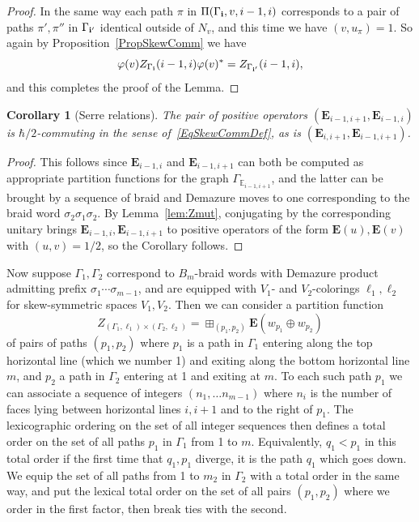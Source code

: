 \documentclass[11pt, reqno]{amsart}
\newtheorem{cor}[theorem]{Corollary}
\theoremstyle{definition}
\numberwithin{equation}{section}
\newcommand{\Eb}{\mathbf{E}}
\def\stgE{\mathbf{E}}
\begin{document}
\begin{proof}
In the same way each path $\pi$ in $\Pi(\Gamma_{\bf i},v,i-1,i)$ corresponds to a pair of paths $\pi',\pi''$ in $\Gamma_{\bf i'}$ identical outside of $N_v$, and this time we have $(v,u_{\pi})=1$. So again by Proposition~\ref{PropSkewComm} we have
$$
\varphi(v)Z_{\Gamma_{\bf i}}(i-1,i) \varphi(v)^* = Z_{\Gamma_{\bf i'}}(i-1,i),
$$ 
and this completes the proof of the Lemma.
\end{proof}


\begin{cor}[Serre relations]
\label{cor-serre}
The pair of positive operators $(\stgE_{i-1,i+1}, \stgE_{i-1,i})$  is $\hbar/2$-commuting in the sense of~\eqref{EqSkewCommDef}, as is $(\stgE_{i,i+1}, \stgE_{i-1,i+1})$.
\end{cor}
\begin{proof}
This follows since $\stgE_{i-1,i}$ and $\stgE_{i-1,i+1}$ can both be computed as appropriate partition functions for the graph $\Gamma_{\mathbb{E}_{i-1,i+1}}$, and the latter can be brought by a sequence of braid and Demazure moves to one corresponding to the braid word  $\sigma_2\sigma_1\sigma_2$. By Lemma~\ref{lem:Zmut}, conjugating by the corresponding unitary brings $\stgE_{i-1,i}, \stgE_{i-1,i+1}$ to positive operators of the form $\Eb(u),\Eb(v)$ with $(u,v)=1/2$, so the Corollary follows.
\end{proof}



Now suppose $\Gamma_1,\Gamma_2$ correspond to $B_m$-braid words with Demazure product admitting prefix $\sigma_1\cdots \sigma_{m-1}$, and are equipped with $V_1$- and $V_2$-colorings $\ell_1,\ell_2$ for skew-symmetric spaces $V_1,V_2$.  Then we can consider a partition function 
$$
Z_{(\Gamma_{1},\ell_1)\times(\Gamma_{2},\ell_2)} =  \boxplus_{(p_1,p_2)}\Eb({w}_{p_1}\oplus {w}_{p_2})
$$ of pairs of paths $(p_1,p_2)$ where $p_1$ is a path in $\Gamma_{1}$ entering along the top horizontal line (which we number 1) and exiting along the bottom horizontal line $m$, and $p_2$ a path in $\Gamma_{2}$ entering at 1 and exiting at $m$. 
To each such path $p_1$ we can associate a sequence of integers $(n_1,\ldots n_{m-1})$ where $n_i$ is the number of faces lying between horizontal lines $i,i+1$ and to the right of $p_1$. The lexicographic ordering on the set of all integer sequences then defines a total order on the set of all paths $p_1$ in $\Gamma_{1}$ from 1 to $m$. Equivalently, $q_1<p_1$ in this total order if the first time that $q_1,p_1$ diverge, it is the path $q_1$ which goes down. We equip the set of all paths from 1 to $m_2$ in $\Gamma_2$ with a total order in the same way, and put the lexical total order on the set of all pairs $(p_1,p_2)$ where we order in the first factor, then break ties with the second.
\end{document}
